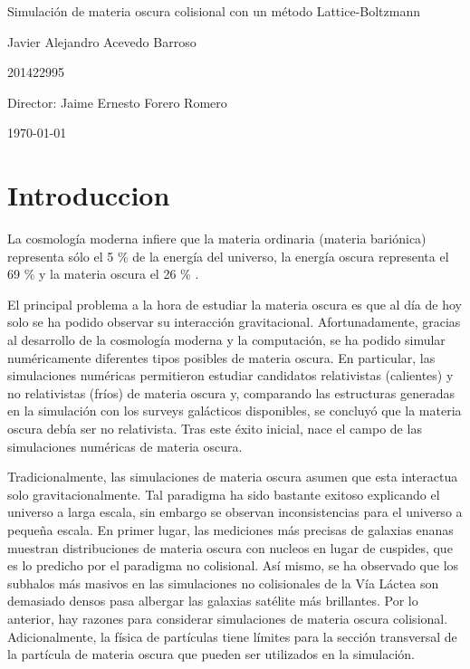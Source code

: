 \documentclass[12pt]{article}
\begin{document}
\begin{center}
\Huge
Simulación de materia oscura colisional con un método Lattice-Boltzmann

\vspace{3mm}
\Large Javier Alejandro Acevedo Barroso

\large
201422995


\vspace{2mm}
\Large
Director: Jaime Ernesto Forero Romero

\normalsize
\vspace{2mm}

\today
\end{center}


\normalsize
\newpage
\section{Introduccion}
La cosmología moderna infiere que la materia ordinaria (materia
bariónica) representa s\'olo el 5 \% de la energía del universo, la
energía oscura representa el 69 \% y la materia oscura el 26 \%
\cite{planckCitetion}.   

El principal problema a la hora de estudiar la materia oscura es que al día de hoy solo se ha podido observar su interacción gravitacional. Afortunadamente, gracias al desarrollo de la cosmología moderna y la computación, se ha podido simular numéricamente diferentes tipos posibles de materia oscura. En particular, las simulaciones numéricas permitieron estudiar candidatos relativistas (calientes) y no relativistas (fríos) de materia oscura y, comparando las estructuras generadas en la simulación con los surveys galácticos disponibles, se concluyó que la materia oscura debía ser no relativista. Tras este éxito inicial, nace el campo de las simulaciones numéricas de materia oscura.\cite{aHistory}

Tradicionalmente, las simulaciones de materia oscura asumen que esta
interactua solo gravitacionalmente. Tal paradigma ha sido bastante
exitoso explicando el universo a larga escala, sin embargo se observan
inconsistencias para el universo a pequeña escala. En primer lugar,
las mediciones más precisas de galaxias enanas muestran distribuciones
de materia oscura con nucleos en lugar de cuspides, que es lo predicho
por el paradigma no colisional. Así mismo, se ha observado que los
subhalos más masivos en las simulaciones no colisionales de la Vía
Láctea son demasiado densos pasa albergar las galaxias satélite más
brillantes\cite{beyondColl}. Por lo anterior, hay razones para
considerar simulaciones de materia oscura colisional. Adicionalmente,
la física de partículas tiene límites para la sección transversal de
la partícula de materia oscura que pueden ser utilizados en la
simulación. 
\end{document}
